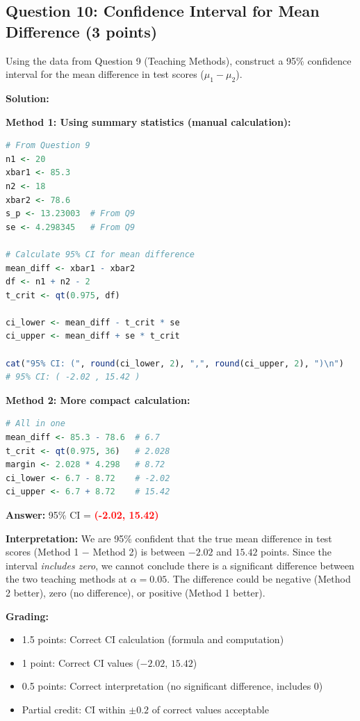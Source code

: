 \documentclass[11pt]{article}
\begin{document}
\subsection*{Question 10: Confidence Interval for Mean Difference (3 points)}

Using the data from Question 9 (Teaching Methods), construct a 95\% confidence interval for the mean difference in test scores ($\mu_1 - \mu_2$).

\vspace{0.3cm}

\textbf{Solution:}

\textbf{Method 1: Using summary statistics (manual calculation):}

\begin{lstlisting}[language=R,basicstyle=\small\ttfamily,frame=single]
# From Question 9
n1 <- 20
xbar1 <- 85.3
n2 <- 18
xbar2 <- 78.6
s_p <- 13.23003  # From Q9
se <- 4.298345   # From Q9

# Calculate 95% CI for mean difference
mean_diff <- xbar1 - xbar2
df <- n1 + n2 - 2
t_crit <- qt(0.975, df)

ci_lower <- mean_diff - t_crit * se
ci_upper <- mean_diff + se * t_crit

cat("95% CI: (", round(ci_lower, 2), ",", round(ci_upper, 2), ")\n")
# 95% CI: ( -2.02 , 15.42 )
\end{lstlisting}

\textbf{Method 2: More compact calculation:}

\begin{lstlisting}[language=R,basicstyle=\small\ttfamily,frame=single]
# All in one
mean_diff <- 85.3 - 78.6  # 6.7
t_crit <- qt(0.975, 36)   # 2.028
margin <- 2.028 * 4.298   # 8.72
ci_lower <- 6.7 - 8.72    # -2.02
ci_upper <- 6.7 + 8.72    # 15.42
\end{lstlisting}

\textbf{Answer:} 95\% CI = \textcolor{red}{\textbf{(-2.02, 15.42)}}

\textbf{Interpretation:} We are 95\% confident that the true mean difference in test scores (Method 1 $-$ Method 2) is between $-2.02$ and $15.42$ points. Since the interval \textit{includes zero}, we cannot conclude there is a significant difference between the two teaching methods at $\alpha = 0.05$. The difference could be negative (Method 2 better), zero (no difference), or positive (Method 1 better).

\textbf{Grading:}
\begin{itemize}
\item 1.5 points: Correct CI calculation (formula and computation)
\item 1 point: Correct CI values ($-2.02$, $15.42$)
\item 0.5 points: Correct interpretation (no significant difference, includes 0)
\item Partial credit: CI within $\pm 0.2$ of correct values acceptable
\end{itemize}
\end{document}
